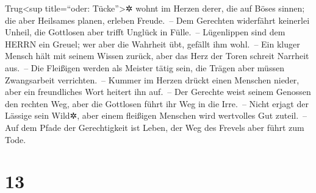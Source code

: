 Trug\textless sup title=``oder: Tücke''\textgreater✲
wohnt im Herzen derer, die auf Böses sinnen; die aber Heilsames planen,
erleben Freude.~-- Dem Gerechten widerfährt keinerlei
Unheil, die Gottlosen aber trifft Unglück in Fülle.~--
Lügenlippen sind dem HERRN ein Greuel; wer aber die
Wahrheit übt, gefällt ihm wohl.~-- Ein kluger Mensch hält
mit seinem Wissen zurück, aber das Herz der Toren schreit Narrheit
aus.~-- Die Fleißigen werden als Meister tätig sein, die
Trägen aber müssen Zwangsarbeit verrichten.~-- Kummer im
Herzen drückt einen Menschen nieder, aber ein freundliches Wort heitert
ihn auf.~-- Der Gerechte weist seinem Genossen den
rechten Weg, aber die Gottlosen führt ihr Weg in die Irre.~--
Nicht erjagt der Lässige sein Wild✲, aber einem fleißigen
Menschen wird wertvolles Gut zuteil.~-- Auf dem Pfade der
Gerechtigkeit ist Leben, der Weg des Frevels aber führt zum Tode.

\hypertarget{section-12}{%
\section{13}\label{section-12}}

